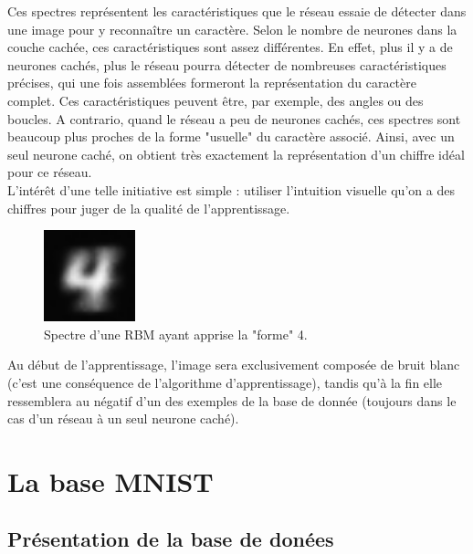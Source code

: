 \documentclass[a4paper,oneside]{report}
\begin{document}
                Ces spectres représentent les caractéristiques que le réseau essaie de détecter dans une image pour y reconnaître un caractère. Selon le nombre de neurones dans la couche cachée, ces caractéristiques sont assez différentes. En effet, plus il y a de neurones cachés, plus le réseau pourra détecter de nombreuses caractéristiques précises, qui une fois assemblées formeront la représentation du caractère complet. Ces caractéristiques peuvent être, par exemple, des angles ou des boucles. A contrario, quand le réseau a peu de neurones cachés, ces spectres sont beaucoup plus proches de la forme "usuelle" du caractère associé. Ainsi, avec un seul neurone caché, on obtient très exactement la représentation d'un chiffre idéal pour ce réseau.\\

                L'intérêt d'une telle initiative est simple : utiliser l'intuition visuelle qu'on a des chiffres pour juger de la qualité de l'apprentissage.

                \begin{figure}
                    \begin{center}
                        \includegraphics[width=75pt]{Images/spectres-01.png}
                    \end{center}
                    \caption{Spectre d'une RBM ayant apprise la "forme" 4.}
                \end{figure}

                Au début de l'apprentissage, l'image sera exclusivement composée de bruit blanc (c'est une conséquence de l'algorithme d'apprentissage), tandis qu'à la fin elle ressemblera au négatif d'un des exemples de la base de donnée (toujours dans le cas d'un réseau à un seul neurone caché).


    \appendix

        \chapter{La base MNIST}

            \section{Présentation de la base de donées}
\end{document}
